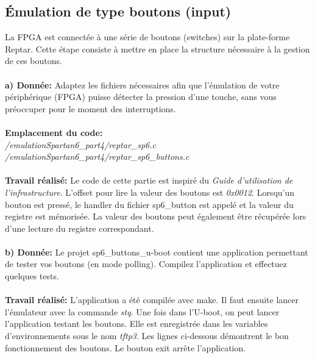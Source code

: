 \subsection{Émulation de type boutons (input)}
La FPGA est connectée à une série de boutons (switches) sur la plate-forme Reptar. Cette étape consiste
à mettre en place la structure nécessaire à la gestion de ces boutons. \\\\
\textbf{a) Donnée: }Adaptez les fichiers nécessaires afin que l'émulation de votre périphérique (FPGA) puisse détecter
la pression d'une touche, sans vous préoccuper pour le moment des interruptions. \\\\
\textbf{Emplacement du code:}\\\textit{/emulationSpartan6\_part4/reptar\_sp6.c}\\
\textit{/emulationSpartan6\_part4/reptar\_sp6\_buttons.c}\\\\
\textbf{Travail réalisé: }Le code de cette partie est inspiré du \textit{Guide d'utilisation de l'infrastructure}. L'offset pour lire la valeur des boutons est \textit{0x0012}. Lorsqu'un bouton est pressé, le handler du fichier sp6\_button est appelé et la valeur du registre est mémorisée. La valeur des boutons peut également être récupérée lors d'une lecture du registre correspondant.\\\\
\textbf{b) Donnée: }Le projet sp6\_buttons\_u-boot contient une application permettant de tester vos boutons (en mode
polling). Compilez l'application et effectuez quelques tests.\\\\
\textbf{Travail réalisé: }L'application a été compilée avec make. Il faut ensuite lancer l'émulateur avec la commande \textit{stq}. Une fois dans l'U-boot, on peut lancer l'application testant les boutons. Elle est enregistrée dans les variables d'environnements sous le nom \textit{tftp3}. Les lignes ci-dessous démontrent le bon fonctionnement des boutons. Le bouton exit arrête l'application. 
